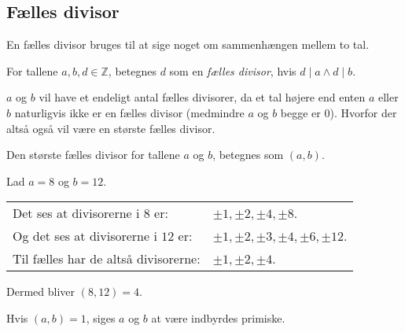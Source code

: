 

\subsection{Fælles divisor}
En fælles divisor bruges til at sige noget om sammenhængen mellem to tal.

\begin{definition}
    For tallene \(a, b, d \in \mathbb{Z}\), betegnes \(d\) som en \emph{fælles divisor}, hvis \(d \mid a \land d \mid b\).
\end{definition}

\(a\) og \(b\) vil have et endeligt antal fælles divisorer, da et tal højere end enten \(a\) eller \(b\) naturligvis ikke er en fælles divisor (medmindre \(a\) og \(b\) begge er \(0\)).
Hvorfor der altså også vil være en største fælles divisor.

\begin{definition}
    Den største fælles divisor for tallene \(a\) og \(b\), betegnes som \((a, b)\).
\end{definition}

\begin{eks}
    Lad \(a = 8\) og \(b = 12\).\\
    \begin{tabular*}{\textwidth}{@{} l l}
        Det ses at divisorerne i \(8\) er:      & \(\pm 1, \pm 2, \pm 4, \pm 8\).\\
        Og det ses at divisorerne i \(12\) er:  &\(\pm 1, \pm 2, \pm 3, \pm 4, \pm 6, \pm 12\).\\
        Til fælles har de altså divisorerne:    & \(\pm 1, \pm 2, \pm 4\).
    \end{tabular*}
    Dermed bliver \((8, 12) = 4\).
\end{eks}


\begin{definition}
    Hvis \((a, b) = 1\), siges \(a\) og \(b\) at være indbyrdes primiske.
\end{definition}

